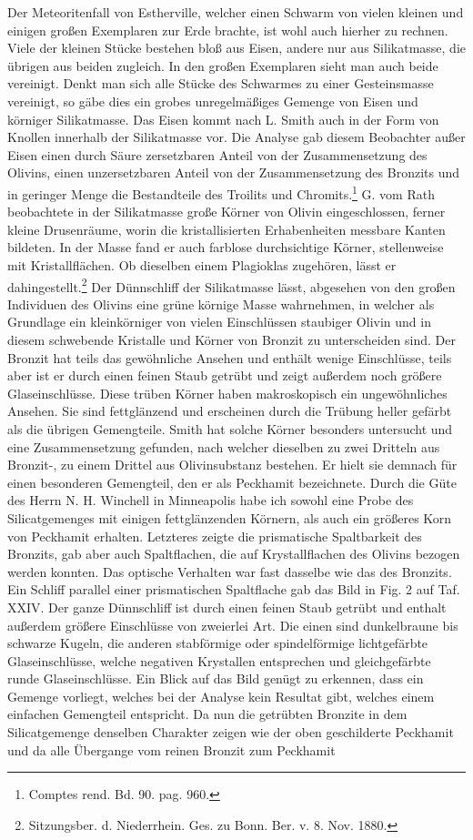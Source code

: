 \documentclass[a4paper, 11pt, oneside, polutonikogreek, german]{article}
\begin{document}
Der Meteoritenfall von Estherville, welcher einen Schwarm von vielen kleinen und einigen großen Exemplaren zur Erde brachte, ist wohl auch hierher zu rechnen. Viele der kleinen Stücke bestehen bloß aus Eisen, andere nur aus Silikatmasse, die übrigen aus beiden zugleich. In den großen Exemplaren sieht man auch beide vereinigt. Denkt man sich alle Stücke des Schwarmes zu einer Gesteinsmasse vereinigt, so gäbe dies ein grobes unregelmäßiges Gemenge von Eisen und körniger Silikatmasse. Das Eisen kommt nach L. Smith auch in der Form von Knollen innerhalb der Silikatmasse vor. Die Analyse gab diesem Beobachter außer Eisen einen durch Säure zersetzbaren Anteil von der Zusammensetzung des Olivins, einen unzersetzbaren Anteil von der Zusammensetzung des Bronzits und in geringer Menge die Bestandteile des Troilits und Chromits.\footnote{Comptes rend. Bd. 90. pag. 960.} G. vom Rath beobachtete in der Silikatmasse große Körner von Olivin eingeschlossen, ferner kleine Drusenräume, worin die kristallisierten Erhabenheiten messbare Kanten bildeten. In der Masse fand er auch farblose durchsichtige Körner, stellenweise mit Kristallflächen. Ob dieselben einem Plagioklas zugehören, lässt er dahingestellt.\footnote{Sitzungsber. d. Niederrhein. Ges. zu Bonn. Ber. v. 8. Nov. 1880.} Der Dünnschliff der Silikatmasse lässt, abgesehen von den großen Individuen des Olivins eine grüne körnige Masse wahrnehmen, in welcher als Grundlage ein kleinkörniger von vielen Einschlüssen staubiger Olivin und in diesem schwebende Kristalle und Körner von Bronzit zu unterscheiden sind. Der Bronzit hat teils das gewöhnliche Ansehen und enthält wenige Einschlüsse, teils aber ist er durch einen feinen Staub getrübt und zeigt außerdem noch größere Glaseinschlüsse. Diese trüben Körner haben makroskopisch ein ungewöhnliches Ansehen. Sie sind fettglänzend und erscheinen durch die Trübung heller gefärbt als die übrigen Gemengteile. Smith hat solche Körner besonders untersucht und eine Zusammensetzung gefunden, nach welcher dieselben zu zwei Dritteln aus Bronzit-, zu einem Drittel aus Olivinsubstanz bestehen. Er hielt sie demnach für einen besonderen Gemengteil, den er als Peckhamit bezeichnete. Durch die Güte des Herrn N. H. Winchell in Minneapolis habe ich sowohl eine Probe des Silicatgemenges mit einigen fettglänzenden Körnern, als auch ein größeres Korn von Peckhamit erhalten. Letzteres zeigte die prismatische Spaltbarkeit des Bronzits, gab aber auch Spaltflachen, die auf Krystallflachen des Olivins bezogen werden konnten. Das optische Verhalten war fast dasselbe wie das des Bronzits. Ein Schliff parallel einer prismatischen Spaltflache gab das Bild in Fig. 2 auf Taf. XXIV. Der ganze Dünnschliff ist durch einen feinen Staub getrübt und enthalt außerdem größere Einschlüsse von zweierlei Art. Die einen sind dunkelbraune bis schwarze Kugeln, die anderen stabförmige oder spindelförmige lichtgefärbte Glaseinschlüsse, welche negativen Krystallen entsprechen und gleichgefärbte runde Glaseinschlüsse. Ein Blick auf das Bild genügt zu erkennen, dass ein Gemenge vorliegt, welches bei der Analyse kein Resultat gibt, welches einem einfachen Gemengteil entspricht. Da nun die getrübten Bronzite in dem Silicatgemenge denselben Charakter zeigen wie der oben geschilderte Peckhamit und da alle Übergange vom reinen Bronzit zum Peckhamit 
\end{document}
